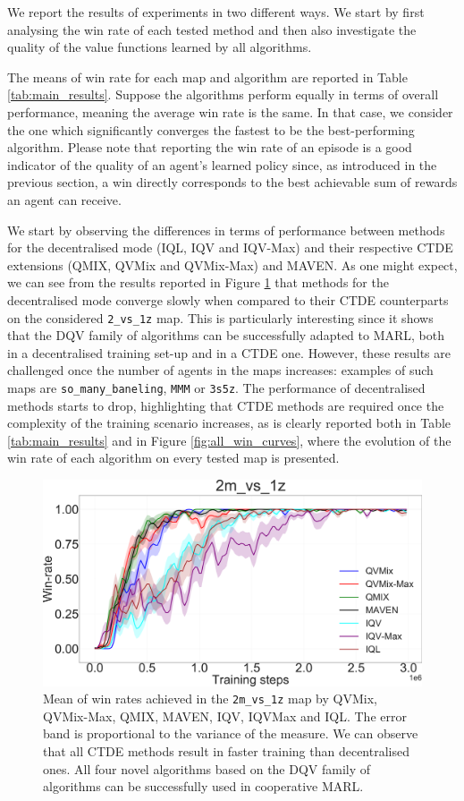 We report the results of experiments in two different ways.
We start by first analysing the win rate of each tested method and then also investigate the quality of the value functions learned by all algorithms.

The means of win rate for each map and algorithm are reported in Table \ref{tab:main_results}. 
Suppose the algorithms perform equally in terms of overall performance, meaning the average win rate is the same. 
In that case, we consider the one which significantly converges the fastest to be the best-performing algorithm.
Please note that reporting the win rate of an episode is a good indicator of the quality of an agent's learned policy since, as introduced in the previous section, a win directly corresponds to the best achievable sum of rewards an agent can receive.

We start by observing the differences in terms of performance between methods for the decentralised mode (IQL, IQV and IQV-Max) and their respective CTDE extensions (QMIX, QVMix and QVMix-Max) and MAVEN.
As one might expect, we can see from the results reported in Figure \ref{fig:ch4_2m1zwin} that methods for the decentralised mode converge slowly when compared to their CTDE counterparts on the considered \texttt{2\_vs\_1z} map.
This is particularly interesting since it shows that the DQV family of algorithms can be successfully adapted to MARL, both in a decentralised training set-up and in a CTDE one.
However, these results are challenged once the number of agents in the maps increases: examples of such maps are \texttt{so\_many\_baneling}, \texttt{MMM} or \texttt{3s5z}.
The performance of decentralised methods starts to drop, highlighting that CTDE methods are required once the complexity of the training scenario increases, as is clearly reported both in Table \ref{tab:main_results} and in Figure \ref{fig:all_win_curves}, where the evolution of the win rate of each algorithm on every tested map is presented.

\begin{figure}
\centering
\includegraphics[width=.8\linewidth]{tex_thesis/figures/ch4/2m1zall.pdf}
\caption{Mean of win rates achieved in the \texttt{2m\_vs\_1z} map by QVMix, QVMix-Max, QMIX, MAVEN, IQV, IQVMax and IQL. The error band is proportional to the variance of the measure. We can observe that all CTDE methods result in faster training than decentralised ones. All four novel algorithms based on the DQV family of algorithms can be successfully used in cooperative MARL.}
\label{fig:ch4_2m1zwin}
\end{figure}

